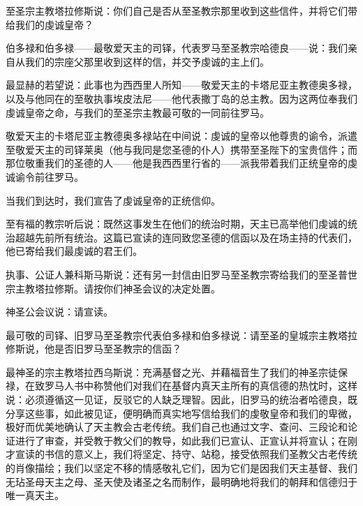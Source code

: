 至圣宗主教塔拉修斯说：你们自己是否从至圣教宗那里收到这些信件，并将它们带给我们的虔诚皇帝？\par

伯多禄和伯多禄——最敬爱天主的司铎，代表罗马至圣教宗哈德良——说：我们亲自从我们的宗座父那里收到这样的信，并交予虔诚的主上们。\par

最显赫的若望说：此事也为西西里人所知——敬爱天主的卡塔尼亚主教德奥多禄，以及与他同在的至敬执事埃皮法尼——他代表撒丁岛的总主教。因为这两位奉我们虔诚皇帝之命，与我们的至圣宗主教最可敬的一同前往罗马。\par

敬爱天主的卡塔尼亚主教德奥多禄站在中间说：虔诚的皇帝以他尊贵的谕令，派遣至敬爱天主的司铎莱奥（他与我同是您圣德的仆人）携带至圣陛下的宝贵信件；而那位敬重我们的圣德的人——他是我西西里行省的——派我带着我们正统皇帝的虔诚谕令前往罗马。\par

当我们到达时，我们宣告了虔诚皇帝的正统信仰。\par

至有福的教宗听后说：既然这事发生在他们的统治时期，天主已高举他们虔诚的统治超越先前所有统治。这篇已宣读的连同致您圣德的信函以及在场主持的代表们，他已寄给我们最虔诚的君王们。\par

执事、公证人兼科斯马斯说：还有另一封信由旧罗马至圣教宗寄给我们的至圣普世宗主教塔拉修斯。请按你们神圣会议的决定处置。\par

神圣公会议说：请宣读。\par

\par

最可敬的司铎、旧罗马至圣教宗代表伯多禄和伯多禄说：请至圣的皇城宗主教塔拉修斯说，他是否旧罗马至圣教宗的信函？\par

最神圣的宗主教塔拉西乌斯说：充满基督之光、并藉福音生了我们的神圣宗徒保禄，在致罗马人书中称赞他们对我们在基督内真天主所有的真信德的热忱时，这样说：必须遵循这一见证，反驳它的人缺乏理智。因此，旧罗马的统治者哈德良，既分享这些事，如此被见证，便明确而真实地写信给我们的虔敬皇帝和我们的卑微，极好而优美地确认了天主教会古老传统。我们自己也通过文字、查问、三段论和论证进行了审查，并受教于教父们的教导，如此我们已宣认、正宣认并将宣认；在刚才宣读的书信的意义上，我们将坚定、持守、站稳，接受依照我们圣教父古老传统的肖像描绘；我们以坚定不移的情感敬礼它们，因为它们是因我们天主基督、我们无玷圣母天主之母、圣天使及诸圣之名而制作，最明确地将我们的朝拜和信德归于唯一真天主。\par

